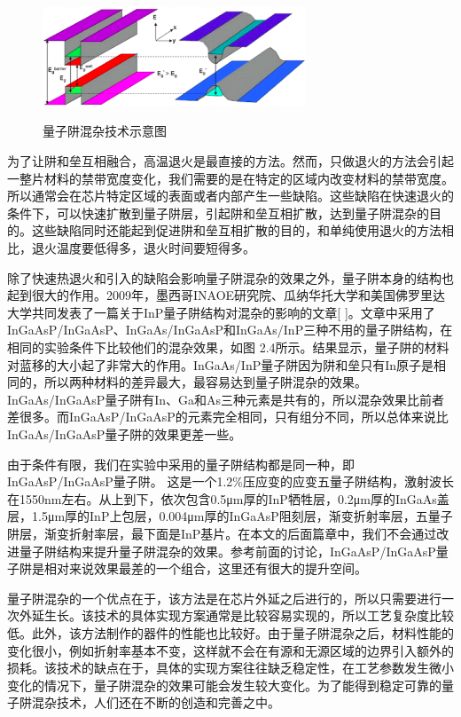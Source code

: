 \documentclass[oneside]{ZJUthesis}
\begin{document}
\begin{figure}[!h]
  \centering
  \includegraphics[width=0.7\textwidth]{./Pictures/qwi.eps}\\
  \caption{量子阱混杂技术示意图}
  \label{fig_qwi}
\end{figure}

为了让阱和垒互相融合，高温退火是最直接的方法。然而，只做退火的方法会引起一整片材料的禁带宽度变化，我们需要的是在特定的区域内改变材料的禁带宽度。所以通常会在芯片特定区域的表面或者内部产生一些缺陷。这些缺陷在快速退火的条件下，可以快速扩散到量子阱层，引起阱和垒互相扩散，达到量子阱混杂的目的。这些缺陷同时还能起到促进阱和垒互相扩散的目的，和单纯使用退火的方法相比，退火温度要低得多，退火时间要短得多。

除了快速热退火和引入的缺陷会影响量子阱混杂的效果之外，量子阱本身的结构也起到很大的作用。2009年，墨西哥INAOE研究院、瓜纳华托大学和美国佛罗里达大学共同发表了一篇关于InP量子阱结构对混杂的影响的文章[ ]。文章中采用了InGaAsP/InGaAsP、InGaAs/InGaAsP和InGaAs/InP三种不用的量子阱结构，在相同的实验条件下比较他们的混杂效果，如图 2.4所示。结果显示，量子阱的材料对蓝移的大小起了非常大的作用。InGaAs/InP量子阱因为阱和垒只有In原子是相同的，所以两种材料的差异最大，最容易达到量子阱混杂的效果。InGaAs/InGaAsP量子阱有In、Ga和As三种元素是共有的，所以混杂效果比前者差很多。而InGaAsP/InGaAsP的元素完全相同，只有组分不同，所以总体来说比InGaAs/InGaAsP量子阱的效果更差一些。

由于条件有限，我们在实验中采用的量子阱结构都是同一种，即InGaAsP/InGaAsP量子阱。 这是一个1.2\%压应变的应变五量子阱结构，激射波长在1550nm左右。从上到下，依次包含0.5μm厚的InP牺牲层，0.2μm厚的InGaAs盖层，1.5μm厚的InP上包层，0.004μm厚的InGaAsP阻刻层，渐变折射率层，五量子阱层，渐变折射率层，最下面是InP基片。在本文的后面篇章中，我们不会通过改进量子阱结构来提升量子阱混杂的效果。参考前面的讨论，InGaAsP/InGaAsP量子阱是相对来说效果最差的一个组合，这里还有很大的提升空间。

量子阱混杂的一个优点在于，该方法是在芯片外延之后进行的，所以只需要进行一次外延生长。该技术的具体实现方案通常是比较容易实现的，所以工艺复杂度比较低。此外，该方法制作的器件的性能也比较好。由于量子阱混杂之后，材料性能的变化很小，例如折射率基本不变，这样就不会在有源和无源区域的边界引入额外的损耗。该技术的缺点在于，具体的实现方案往往缺乏稳定性，在工艺参数发生微小变化的情况下，量子阱混杂的效果可能会发生较大变化。为了能得到稳定可靠的量子阱混杂技术，人们还在不断的创造和完善之中。
\end{document}
